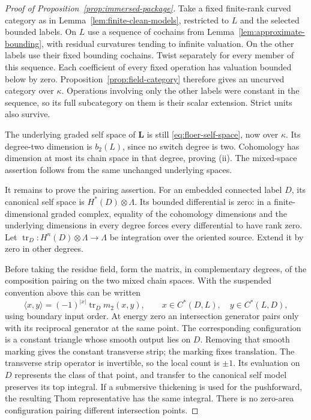 \documentclass[11pt]{article}
\numberwithin{equation}{section}
\theoremstyle{definition}
\theoremstyle{remark}
\begin{document}
\begin{proof}[Proof of Proposition~\ref{prop:immersed-package}]
Take a fixed finite-rank curved category as in
Lemma~\ref{lem:finite-clean-models}, restricted to $L$ and the selected
bounded labels.  On $L$ use a sequence of cochains
from Lemma~\ref{lem:approximate-bounding}, with residual curvatures
tending to infinite valuation.  On the other labels use their fixed
bounding cochains.  Twist separately for every member of this
sequence.  Each coefficient of every fixed operation has valuation
bounded below by zero.  Proposition~\ref{prop:field-category} therefore
gives an uncurved category over $\kappa$.  Operations involving only
the other labels were constant in the sequence, so its full
subcategory on them is their scalar extension.  Strict units also
survive.

The underlying graded self space of $\mathbf L$ is still
\eqref{eq:floer-self-space}, now over $\kappa$.  Its degree-two
dimension is $b_2(L)$, since no switch degree is two.  Cohomology
has dimension at most its chain space in that degree, proving (ii).
The mixed-space assertion follows from the same unchanged
underlying spaces.

It remains to prove the pairing assertion.  For an embedded connected
label $D$, its canonical self space is $H^*(D)\otimes\Lambda$.  Its
bounded differential is zero: in a finite-dimensional graded complex,
equality of the cohomology dimensions and the underlying dimensions
in every degree forces every differential to have rank zero.
Let $\operatorname{tr}_D:H^n(D)\otimes\Lambda\to\Lambda$ be integration
over the oriented source.  Extend it by zero in other degrees.

Before taking the residue field, form the matrix, in complementary
degrees, of the composition pairing on the two mixed chain spaces.
With the suspended convention above this can be written
\[
 \langle x,y\rangle=(-1)^{|x|}
 \operatorname{tr}_D m_2(x,y),
 \qquad x\in C^*(D,L),\quad y\in C^*(L,D),
\]
using boundary input order.  At energy zero an intersection generator
pairs only with its reciprocal generator at the same point.  The
corresponding configuration is a constant triangle whose smooth
output lies on $D$.  Removing that smooth marking gives the
constant transverse strip; the marking fixes translation.  The
transverse strip operator is invertible, so the local count is
$\pm1$.  Its evaluation on $D$ represents the class of that point,
and transfer to the canonical self model preserves its top integral.
If a submersive thickening is used for the pushforward, the resulting
Thom representative has the same integral.  There is no zero-area
configuration pairing different intersection points.


\end{proof}
\end{document}
